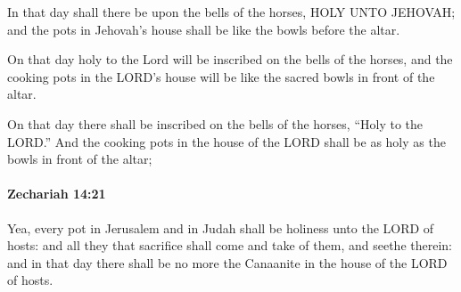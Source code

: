 			\begin{versebox}
					\item[BHS] 
					\item[LXX] 
					\item[ASV] In that day shall there be upon the bells of the horses, HOLY UNTO JEHOVAH; and the pots in Jehovah's house shall be like the bowls before the altar.
					\item[NIV] On that day holy to the Lord will be inscribed on the bells of the horses, and the cooking pots in the LORD’s house will be like the sacred bowls in front of the altar.
					\item[NRSV] On that day there shall be inscribed on the bells of the horses, “Holy to the LORD.” And the cooking pots in the house of the LORD shall be as holy as the bowls in front of the altar;
			\end{versebox}

		\paragraph{Zechariah 14:21} %
			\label{ZECHARIAH-14-21}

			Yea, every pot in Jerusalem and in Judah shall be holiness unto the LORD of hosts: and all they that sacrifice shall come and take of them, and seethe therein: and in that day there shall be no more the Canaanite in the house of the LORD of hosts.

